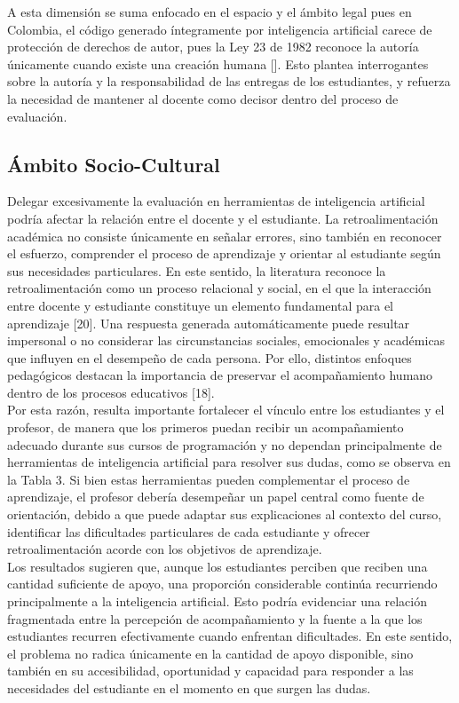 \documentclass[letterpaper, 10 pt, conference]{ieeeconf}
\begin{document}
    A esta dimensión se suma enfocado en el espacio y el ámbito legal pues en Colombia, el código generado íntegramente por inteligencia artificial carece de protección de derechos de autor, pues la Ley 23 de 1982 reconoce la autoría únicamente cuando existe una creación humana []. Esto plantea interrogantes sobre la autoría y la responsabilidad de las entregas de los estudiantes, y refuerza la necesidad de mantener al docente como decisor dentro del proceso de evaluación.

    \subsection{Ámbito Socio-Cultural}
    Delegar excesivamente la evaluación en herramientas de inteligencia artificial podría afectar la relación entre el docente y el estudiante. La retroalimentación académica no consiste únicamente en señalar errores, sino también en reconocer el esfuerzo, comprender el proceso de aprendizaje y orientar al estudiante según sus necesidades particulares. En este sentido, la literatura reconoce la retroalimentación como un proceso relacional y social, en el que la interacción entre docente y estudiante constituye un elemento fundamental para el aprendizaje [20]. Una respuesta generada automáticamente puede resultar impersonal o no considerar las circunstancias sociales, emocionales y académicas que influyen en el desempeño de cada persona. Por ello, distintos enfoques pedagógicos destacan la importancia de preservar el acompañamiento humano dentro de los procesos educativos [18].
    \\
    Por esta razón, resulta importante fortalecer el vínculo entre los estudiantes y el profesor, de manera que los primeros puedan recibir un acompañamiento adecuado durante sus cursos de programación y no dependan principalmente de herramientas de inteligencia artificial para resolver sus dudas, como se observa en la Tabla 3. Si bien estas herramientas pueden complementar el proceso de aprendizaje, el profesor debería desempeñar un papel central como fuente de orientación, debido a que puede adaptar sus explicaciones al contexto del curso, identificar las dificultades particulares de cada estudiante y ofrecer retroalimentación acorde con los objetivos de aprendizaje.
    \\
    Los resultados sugieren que, aunque los estudiantes perciben que reciben una cantidad suficiente de apoyo, una proporción considerable continúa recurriendo principalmente a la inteligencia artificial. Esto podría evidenciar una relación fragmentada entre la percepción de acompañamiento y la fuente a la que los estudiantes recurren efectivamente cuando enfrentan dificultades. En este sentido, el problema no radica únicamente en la cantidad de apoyo disponible, sino también en su accesibilidad, oportunidad y capacidad para responder a las necesidades del estudiante en el momento en que surgen las dudas.
\end{document}
